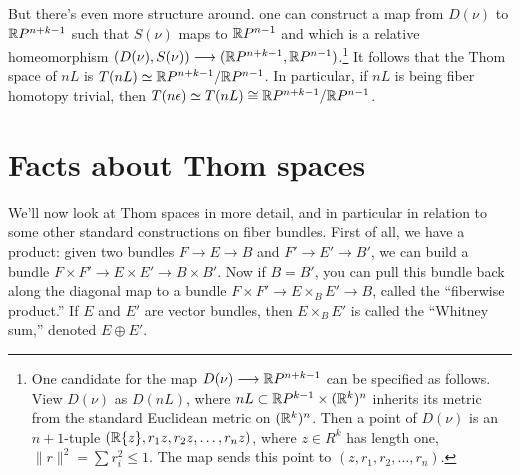 But there's even more structure around.   one can construct a map from $D(\nu)$ to $\mathbb{R} P^{n+k-1}$ such that $S(\nu)$ maps to $\mathbb{R} P^{n-1}$ and which is a relative homeomorphism $(D(\nu), S(\nu)) \longrightarrow (\mathbb{R} P^{n+k-1}, \mathbb{R} P^{n-1})$.\footnote{One candidate for the map $D(\nu)\longrightarrow\mathbb{R} P^{n+k-1}$ can be specified as follows. View $D(\nu)$ as $D(nL)$, where $nL\subset \mathbb{R} P^{k-1}\times (\mathbb{R}^k)^n$ inherits its metric from the standard Euclidean metric on $(\mathbb{R}^k)^n$. Then a point of $D(\nu)$ is an $n+1$-tuple $(\mathbb{R}\{z\},r_1z,r_2z,\ldots,r_nz)$, where $z\in R^k$ has length one, $\|r\|^2=\sum r_i^2\leq1$. The map sends this point to $(z,r_1,r_2,\ldots,r_n)$.}
It follows that the Thom space of $nL$ is $T(nL)\simeq\mathbb{R} P^{n+k-1}/\mathbb{R} P^{n-1}$. In particular, if $nL$ is being fiber homotopy trivial, then $T(n\epsilon) \simeq T(nL) \cong \mathbb{R} P^{n+k-1}/\mathbb{R} P^{n-1}$.
%

\fi
{}
\section{Facts about Thom spaces} %
\label{FactsAboutThomSpaces}
\ifx\OutputFactsAboutThomSpaces\undefined\else
We'll now look at Thom spaces in more detail, and in particular in relation to some other standard constructions on fiber bundles.  First of all, we have a product: given two bundles $F \to E \to B$ and $F' \to E' \to B'$, we can build a bundle $F \times F' \to E \times E' \to B \times B'$.  Now if $B = B'$, you can pull this bundle back along the diagonal map to a bundle $F \times F' \to E \times_B E' \to B$, called the ``fiberwise product.''  If $E$ and $E'$ are vector bundles, then $E \times_B E'$ is called the ``Whitney sum,'' denoted $E \oplus E'$.


